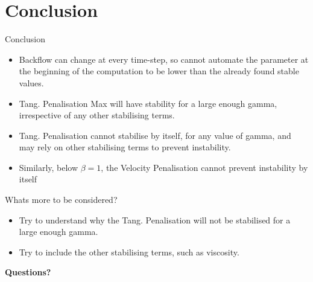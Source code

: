 \section{Conclusion}
    \begin{frame}{Conclusion}
        \begin{itemize}
            \item Backflow can change at every time-step, so cannot automate the parameter at the beginning of the computation to be lower than the already found stable values.
            \item Tang. Penalisation Max will have stability for a large enough gamma, irrespective of any other stabilising terms.
            \item Tang. Penalisation cannot stabilise by itself, for any value of gamma, and may rely on other stabilising terms to prevent instability.
            \item Similarly, below \(\beta = 1\), the Velocity Penalisation cannot prevent instability by itself
        \end{itemize}    
    \end{frame}
    
    \begin{frame}{Whats more to be considered?}
    \begin{itemize}
        \item Try to understand why the Tang. Penalisation will not be stabilised for a large enough gamma.
        \item Try to include the other stabilising terms, such as viscosity.
    \end{itemize}
        
    \end{frame}

    
    \begin{frame}{}
        \begin{center}
            \huge \textbf{Questions?}
        \end{center}
    \end{frame}
